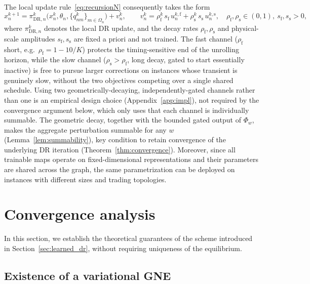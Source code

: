 \documentclass[final]{l4dc2026}
\begin{document}
The local update rule~\eqref{eq:recursionN} consequently takes the form
\begin{equation}
  x_n^{k+1} = \pi_{\mathrm{DR},n}^k\big(x_n^k,\theta_n,\{q_{nm}^k\}_{m\in\Omega_n}\big) + v_n^k,
  \qquad
  v_n^k = \rho_{\mathrm f}^k\, s_{\mathrm f}\, u_n^{k,\mathrm f} + \rho_{\mathrm s}^k\, s_{\mathrm s}\, u_n^{k,\mathrm s},
  \quad
  \rho_{\mathrm f},\rho_{\mathrm s}\in(0,1),\ s_{\mathrm f},s_{\mathrm s}>0,
  \label{eq:decaying_perturbation}
\end{equation}
where $\pi_{\mathrm{DR},n}^k$ denotes the local DR update, and the decay rates $\rho_{\mathrm f},\rho_{\mathrm s}$ and physical-scale amplitudes $s_{\mathrm f},s_{\mathrm s}$ are fixed a priori and not trained. The fast channel ($\rho_{\mathrm f}$ short, e.g.\ $\rho_{\mathrm f}=1-10/K$) protects the timing-sensitive end of the unrolling horizon, while the slow channel ($\rho_{\mathrm s}>\rho_{\mathrm f}$, long decay, gated to start essentially inactive) is free to pursue larger corrections on instances whose transient is genuinely slow, without the two objectives competing over a single shared schedule. Using two geometrically-decaying, independently-gated channels rather than one is an empirical design choice (Appendix~\ref{app:impl}), not required by the convergence argument below, which only uses that each channel is individually summable. The geometric decay, together with the bounded gated output of $\Phi_w$, makes the aggregate perturbation summable for any $w$ (Lemma~\ref{lem:summability}), key condition to retain convergence of the underlying DR iteration (Theorem~\ref{thm:convergence}).
Moreover, since all trainable maps operate on fixed-dimensional representations and their parameters are shared across the graph, the same parametrization can be deployed on instances with different sizes and trading topologies.


\section{Convergence analysis}
\label{sec:guarantees}

In this section, we establish the theoretical guarantees of the scheme introduced in Section~\ref{sec:learned_dr}, without requiring uniqueness of the equilibrium.

\subsection{Existence of a variational GNE}
\end{document}
